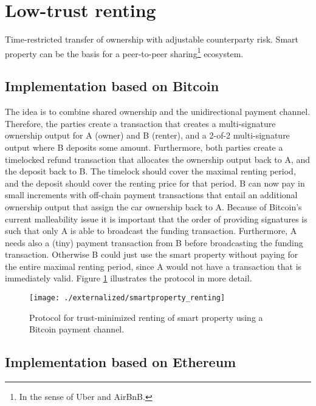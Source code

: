\section{Low-trust renting}

Time-restricted transfer of ownership with adjustable counterparty risk. Smart property can be the basis for a peer-to-peer sharing\footnote{In the sense of Uber and AirBnB.} ecosystem. 

\subsection{Implementation based on Bitcoin}

The idea is to combine shared ownership and the unidirectional payment channel. Therefore, the parties create a transaction that creates a multi-signature ownership output for A (owner) and B (renter), and a 2-of-2 multi-signature output where B deposits some amount. Furthermore, both parties create a timelocked refund transaction that allocates the ownership output back to A, and the deposit back to B. The timelock should cover the maximal renting period, and the deposit should cover the renting price for that period. B can now pay in small increments with off-chain payment transactions that entail an additional ownership output that assign the car ownership back to A. Because of Bitcoin's current malleability issue it is important that the order of providing signatures is such that only A is able to broadcast the funding transaction. Furthermore, A needs also a (tiny) payment transaction from B before broadcasting the funding transaction. Otherwise B could just use the smart property without paying for the entire maximal renting period, since A would not have a transaction that is immediately valid. Figure \ref{fig:smartproperty_renting} illustrates the protocol in more detail.

\begin{figure}[!t]
    \centering
    \texttt{[image: ./externalized/smartproperty\_renting]}
    \caption{Protocol for trust-minimized renting of smart property using a Bitcoin payment channel.}
    \label{fig:smartproperty_renting}
  \end{figure}

\subsection{Implementation based on Ethereum}


